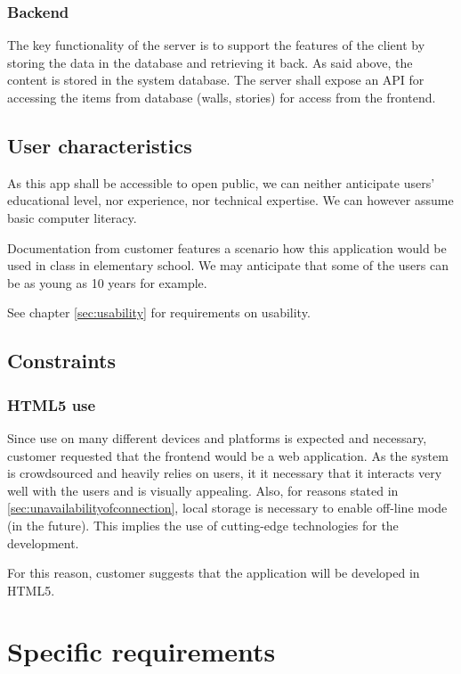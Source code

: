 \documentclass[11pt]{book}
\begin{document}
\subsubsection{Backend}
The key functionality of the server is to support the features of the client by storing the data in the database and retrieving it back. As said above, the content is stored in the system database. The server shall expose an API for accessing the items from database (walls, stories) for access from the frontend.

\subsection{User characteristics} \label{sec:srs-usercharacteristics}
As this app shall be accessible to open public, we can neither anticipate users' educational level, nor experience, nor technical expertise. We can however assume basic computer literacy.

Documentation from customer features a scenario how this application would be used in class in elementary school. We may anticipate that some of the users can be as young as 10 years for example.

See chapter \ref{sec:usability} for requirements on usability.

\subsection{Constraints}

\subsubsection{HTML5 use}
Since use on many different devices and platforms is expected and necessary, customer requested that the frontend would be a web application. As the system is crowdsourced and heavily relies on users, it it necessary that it interacts very well with the users and is visually appealing. Also, for reasons stated in \ref{sec:unavailabilityofconnection}, local storage is necessary to enable off-line mode (in the future). This implies the use of cutting-edge technologies for the development.

For this reason, customer suggests that the application will be developed in HTML5.

\section{Specific requirements}\label{sec:specificrequirements}
\end{document}
